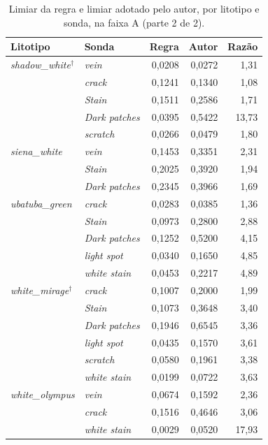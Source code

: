 \begin{table}[ht]
  \caption{Limiar da regra e limiar adotado pelo autor, por litotipo e sonda, na faixa A (parte 2 de 2).}
  \label{tab:apendice_limiares_2}
  \centering
  \footnotesize
  \begin{tabular}{llrrr}
    \hline
    \bfseries Litotipo & \bfseries Sonda & \bfseries Regra & \bfseries Autor & \bfseries Razão \\
    \hline
    \textit{shadow\_white}$^{\dagger}$ & \textit{vein} & 0,0208 & 0,0272 & 1,31 \\
     & \textit{crack} & 0,1241 & 0,1340 & 1,08 \\
     & \textit{Stain} & 0,1511 & 0,2586 & 1,71 \\
     & \textit{Dark patches} & 0,0395 & 0,5422 & 13,73 \\
     & \textit{scratch} & 0,0266 & 0,0479 & 1,80 \\
    \hline
    \textit{siena\_white} & \textit{vein} & 0,1453 & 0,3351 & 2,31 \\
     & \textit{Stain} & 0,2025 & 0,3920 & 1,94 \\
     & \textit{Dark patches} & 0,2345 & 0,3966 & 1,69 \\
    \hline
    \textit{ubatuba\_green} & \textit{crack} & 0,0283 & 0,0385 & 1,36 \\
     & \textit{Stain} & 0,0973 & 0,2800 & 2,88 \\
     & \textit{Dark patches} & 0,1252 & 0,5200 & 4,15 \\
     & \textit{light spot} & 0,0340 & 0,1650 & 4,85 \\
     & \textit{white stain} & 0,0453 & 0,2217 & 4,89 \\
    \hline
    \textit{white\_mirage}$^{\dagger}$ & \textit{crack} & 0,1007 & 0,2000 & 1,99 \\
     & \textit{Stain} & 0,1073 & 0,3648 & 3,40 \\
     & \textit{Dark patches} & 0,1946 & 0,6545 & 3,36 \\
     & \textit{light spot} & 0,0435 & 0,1570 & 3,61 \\
     & \textit{scratch} & 0,0580 & 0,1961 & 3,38 \\
     & \textit{white stain} & 0,0199 & 0,0722 & 3,63 \\
    \hline
    \textit{white\_olympus} & \textit{vein} & 0,0674 & 0,1592 & 2,36 \\
     & \textit{crack} & 0,1516 & 0,4646 & 3,06 \\
     & \textit{white stain} & 0,0029 & 0,0520 & 17,93 \\
    \hline
  \end{tabular}
\end{table}
